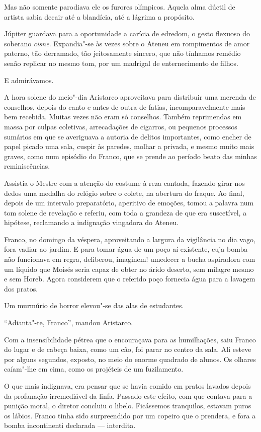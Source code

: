 Mas não somente parodiava ele os furores
olímpicos. Aquela alma dúctil de artista sabia decair até a blandícia,
até a lágrima a propósito. 

Júpiter guardava para a oportunidade a
carícia de edredom, o gesto flexuoso do soberano \textit{cisne}. Expandia"-se
às vezes sobre o Ateneu em rompimentos de amor paterno, tão derramado,
tão jeitosamente sincero, que não tínhamos remédio senão replicar no
mesmo tom, por um madrigal de enternecimento de filhos. 

E admirávamos.

A hora solene do meio"-dia Aristarco aproveitava para distribuir uma
merenda de conselhos, depois do canto e antes de outra de fatias,
incomparavelmente mais bem recebida. Muitas vezes não eram só
conselhos. Também reprimendas em massa por culpas coletivas,
arrecadações de cigarros, ou pequenos processos sumários em que se
averiguava a autoria de delitos importantes, como encher de papel
picado uma sala, cuspir às paredes, molhar a privada, e mesmo muito
mais graves, como num episódio do Franco, que se prende ao período
beato das minhas reminiscências. 

Assistia o Mestre com a atenção do
costume à reza cantada, fazendo girar nos dedos uma medalha do relógio
sobre o colete, na abertura do fraque. Ao final, depois de um intervalo
preparatório, aperitivo de emoções, tomou a palavra num tom solene de
revelação e referiu, com toda a grandeza de que era suscetível, a
hipótese, reclamando a indignação vingadora do Ateneu. 

Franco, no domingo da véspera, aproveitando a largura da vigilância no dia vago,
fora vadiar ao jardim. E para tomar água de um poço aí existente, cuja
bomba não funcionava em regra, deliberou, imaginem! umedecer a bucha
aspiradora com um líquido que Moisés seria capaz de obter no árido
deserto, sem milagre mesmo e sem Horeb. Agora considerem que o referido
poço fornecia água para a lavagem dos pratos. 

Um murmúrio de horror elevou"-se das alas de estudantes. 

``Adianta"-te, Franco'', mandou Aristarco. 

Com a insensibilidade pétrea que o encouraçava para as
humilhações, saiu Franco do lugar e de cabeça baixa, como um cão, foi
parar no centro da sala. Ali esteve por alguns segundos, exposto, no
meio do enorme quadrado de alunos. Os olhares caíam"-lhe em cima, como
os projéteis de um fuzilamento. 

O que mais indignava, era pensar que se
havia comido em pratos lavados depois da profanação irremediável da
linfa. Passado este efeito, com que contava para a punição moral, o
diretor concluiu o libelo. Ficássemos tranquilos, estavam puros os lábios. Franco tinha
sido surpreendido por um copeiro que o prendera, e fora a bomba
incontinenti declarada --- interdita. 

